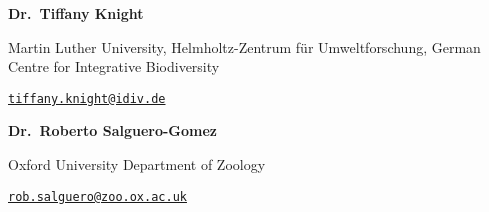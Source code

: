\documentclass[11pt,]{article}
\begin{document}
\textbf{Dr.~Tiffany Knight}

Martin Luther University, Helmholtz-Zentrum für Umweltforschung, German
Centre for Integrative Biodiversity

\href{mailto:tiffany.knight@idiv.de}{\nolinkurl{tiffany.knight@idiv.de}}

\textbf{Dr.~Roberto Salguero-Gomez}

Oxford University Department of Zoology

\href{mailto:rob.salguero@zoo.ox.ac.uk}{\nolinkurl{rob.salguero@zoo.ox.ac.uk}}
\end{document}
